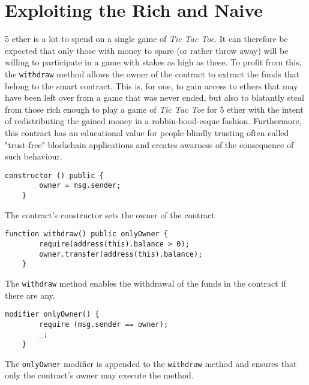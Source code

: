 \documentclass[10pt]{article}
\begin{document}
\section{Exploiting the Rich and Naive}
5 ether is a lot to spend on a single game of \emph{Tic Tac Toe}. It can therefore be expected that only those with money to spare (or rather throw away) will be willing to participate in a game with stakes as high as these. To profit from this, the \texttt{withdraw} method allows the owner of the contract to extract the funds that belong to the smart contract. This is, for one, to gain access to ethers that may have been left over from a game that was never ended, but also to blatantly steal from those rich enough to play a game of \emph{Tic Tac Toe} for 5 ether with the intent of redistributing the gained money in a robbin-hood-esque fashion.
\newline Furthermore, this contract has an educational value for people blindly trusting often called "trust-free" blockchain applications and creates awarness of the consequence of such behaviour.
\begin{Verbatim}[fontsize=\small]
    constructor () public {
        owner = msg.sender;
    }
\end{Verbatim}
The contract's constructor sets the owner of the contract
\begin{Verbatim}[fontsize=\small]
    function withdraw() public onlyOwner {
        require(address(this).balance > 0);
        owner.transfer(address(this).balance);
    }
\end{Verbatim}
The \texttt{withdraw} method enables the withdrawal of the funds in the contract if there are any.
\begin{Verbatim}[fontsize=\small]
    modifier onlyOwner() {
        require (msg.sender == owner);
        _;
    }
\end{Verbatim}
The \texttt{onlyOwner} modifier is appended to the \texttt{withdraw} method and ensures that only the contract's owner may execute the method.
\end{document}
